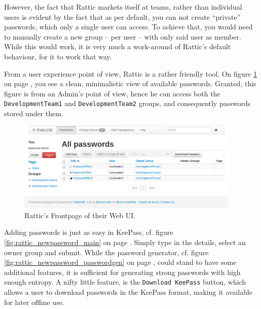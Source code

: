 			However, the fact that Rattic markets itself at teams, rather than individual users is evident by the fact that as per default, you can not create ``private'' passwords, which only a single user can access. To achieve that, you would need to manually create a new group -- per user -- with only said user as member. While this would work, it is very much a work-around of Rattic's default behaviour, for it to work that way.

			From a user experience point of view, Rattic is a rather friendly tool. On figure \ref{fig:rattic_main} on page \pageref{fig:rattic_main}, you see a clean, minimalistic view of available passwords. Granted, this figure is from an Admin's point of view, hence he can access both the \verb=DevelopmentTeam1= and \verb=DevelopmentTeam2= groups, and consequently passwords stored under them.

			\begin{figure}[h!]
				\centering
				\includegraphics[width=0.95\textwidth]{figures/analysis/rattic_main.png}
				\caption{Rattic's Frontpage of their Web UI.}
				\label{fig:rattic_main}
			\end{figure}

			Adding passwords is just as easy in KeePass, cf. figure \ref{fig:rattic_newpassword_main} on page \pageref{fig:rattic_newpassword_main}. Simply type in the details, select an owner group and submit. While the password generator, cf. figure \ref{fig:rattic_newpassword_passwordgen} on page \pageref{fig:rattic_newpassword_passwordgen}, could stand to have some additional features, it is sufficient for generating strong passwords with high enough entropy. A nifty little feature, is the \verb=Download KeePass= button, which allows a user to download passwords in the KeePass format, making it available for later offline use.

